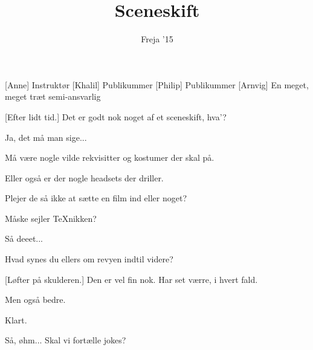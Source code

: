 \documentclass[a4paper,11pt]{article}
\title{Sceneskift}
\author{Freja '15}
\begin{document}
\maketitle

\begin{roles}
[Anne] Instruktør
[Khalil] Publikummer
[Philip] Publikummer
[Arnvig] En meget, meget træt semi-ansvarlig
\end{roles}

\begin{props}
\end{props}

\begin{sketch}



[Efter lidt tid.] Det er godt nok noget af et sceneskift, hva'?

 Ja, det må man sige...

 Må være nogle vilde rekvisitter og kostumer der skal på.

 Eller også er der nogle headsets der driller.

 Plejer de så ikke at sætte en film ind eller noget?

 Måske sejler TeXnikken?


 Så deeet...

 Hvad synes du ellers om revyen indtil videre?

[Løfter på skulderen.] Den er vel fin nok. Har set værre, i hvert fald.

 Men også bedre.

 Klart.


 Så, øhm... Skal vi fortælle jokes?



\end{sketch}
\end{document}
